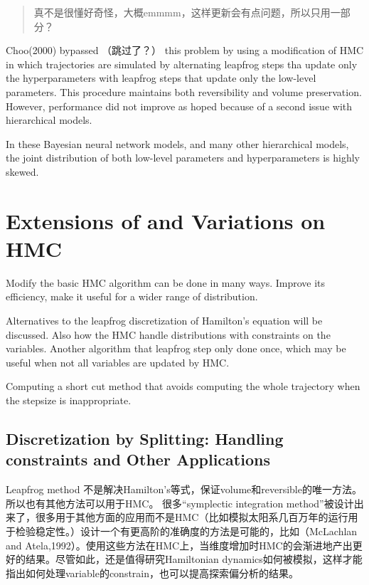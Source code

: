 \documentclass[
]{book}
\theoremstyle{definition}
\theoremstyle{definition}
\theoremstyle{definition}
\theoremstyle{remark}
\begin{document}
\begin{quote}
真不是很懂好奇怪，大概emmmm，这样更新会有点问题，所以只用一部分？
\end{quote}

Choo(2000) bypassed （跳过了？） this problem by using a modification of HMC in which trajectories are simulated by alternating leapfrog steps tha update only the hyperparameters with leapfrog steps that update only the low-level parameters. This procedure maintains both reversibility and volume preservation. However, performance did not improve as hoped because of a second issue with hierarchical models.

In these Bayesian neural network models, and many other hierarchical models, the joint distribution of both low-level parameters and hyperparameters is highly skewed.

\hypertarget{extensions-of-and-variations-on-hmc}{%
\section{Extensions of and Variations on HMC}\label{extensions-of-and-variations-on-hmc}}

Modify the basic HMC algorithm can be done in many ways. Improve its efficiency, make it useful for a wider range of distribution.

Alternatives to the leapfrog discretization of Hamilton's equation will be discussed. Also how the HMC handle distributions with constraints on the variables.
Another algorithm that leapfrog step only done once, which may be useful when not all variables are updated by HMC.

Computing a short cut method that avoids computing the whole trajectory when the stepsize is inappropriate.

\hypertarget{discretization-by-splitting-handling-constraints-and-other-applications}{%
\subsection{Discretization by Splitting: Handling constraints and Other Applications}\label{discretization-by-splitting-handling-constraints-and-other-applications}}

Leapfrog method 不是解决Hamilton's等式，保证volume和reversible的唯一方法。所以也有其他方法可以用于HMC。 很多``symplectic integration method''被设计出来了，很多用于其他方面的应用而不是HMC（比如模拟太阳系几百万年的运行用于检验稳定性。）设计一个有更高阶的准确度的方法是可能的，比如（McLachlan and Atela,1992）。使用这些方法在HMC上，当维度增加时HMC的会渐进地产出更好的结果。尽管如此，还是值得研究Hamiltonian dynamics如何被模拟，这样才能指出如何处理variable的constrain，也可以提高探索偏分析的结果。
\end{document}
